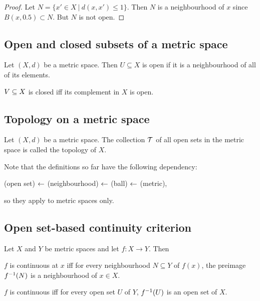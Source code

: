 \begin{proof}
  Let $N = \{x' \in X ~|~ d(x, x') \leq 1\}$. Then $N$ is a neighbourhood of $x$ since
  $B(x, 0.5) \subset N$. But $N$ is not open.
\end{proof}





\subsection{Open and closed subsets of a metric space}
\begin{definition}
  Let $(X, d)$ be a metric space. Then $U \subseteq X$ is open if it is a neighbourhood of all of
  its elements.

  $V \subseteq X$ is closed iff its complement in $X$ is open.
\end{definition}

\subsection{Topology on a metric space}
\begin{definition}
  Let $(X, d)$ be a metric space. The collection $\mathcal T$ of all open sets in the metric space is
  called the topology of $X$.
\end{definition}

\begin{remark*}
  Note that the definitions so far have the following dependency:

  (open set) $\leftarrow$ (neighbourhood) $\leftarrow$ (ball) $\leftarrow$ (metric),

  so they apply to metric spaces only.
\end{remark*}

\subsection{Open set-based continuity criterion}
\begin{theorem}
  Let $X$ and $Y$ be metric spaces and let $f:X \to Y$. Then

  $f$ is continuous at $x$ iff for every neighbourhood $N \subseteq Y$ of $f(x)$, the preimage
  $f^{-1}(N)$ is a neighbourhood of $x \in X$.

  $f$ is continuous iff for every open set $U$ of $Y$, $f^{-1}(U)$ is an open set of $X$.
\end{theorem}

